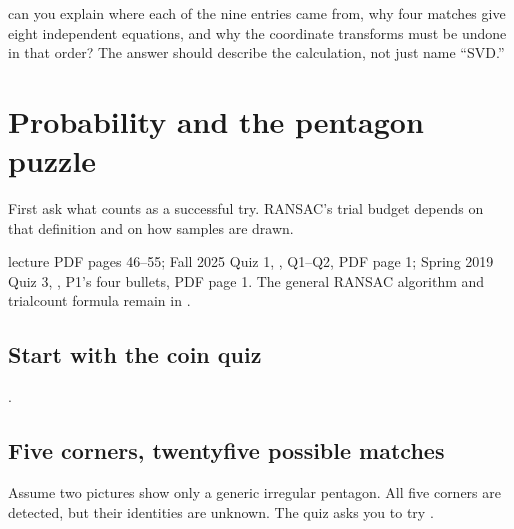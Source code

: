 \documentclass[letterpaper,11pt,english,openany,oneside]{jupyterBook}
\begin{document}
\sphinxAtStartPar
{} can you explain where each of the nine entries came from, why four matches give eight independent equations, and why the coordinate transforms must be undone in that order? The answer should describe the calculation, not just name “SVD.”

\sphinxstepscope


\section{Probability and the pentagon puzzle}
\label{\detokenize{lectures/lecture03/probability-ransac:probability-and-the-pentagon-puzzle}}\label{\detokenize{lectures/lecture03/probability-ransac:lec03-ransac-practice}}\label{\detokenize{lectures/lecture03/probability-ransac::doc}}
\sphinxAtStartPar
{} First ask what counts as a successful try. RANSAC’s trial budget depends on that definition and on how samples are drawn.

\sphinxAtStartPar
{} lecture PDF pages 46–55; Fall 2025 Quiz 1, , Q1–Q2, PDF page 1; Spring 2019 Quiz 3, , P1’s four bullets, PDF page 1. The general RANSAC algorithm and trial\sphinxhyphen{}count formula remain in {\hyperref[\detokenize{lectures/lecture02/estimation::doc}]{}}.


\subsection{Start with the coin quiz}
\label{\detokenize{lectures/lecture03/probability-ransac:start-with-the-coin-quiz}}
\sphinxAtStartPar
{} {\hyperref[\detokenize{lectures/lecture01/quiz-workbook:quiz-17-q1}]{}}.


\subsection{Five corners, twenty\sphinxhyphen{}five possible matches}
\label{\detokenize{lectures/lecture03/probability-ransac:five-corners-twenty-five-possible-matches}}
\sphinxAtStartPar
Assume two pictures show only a generic irregular pentagon. All five corners are detected, but their identities are unknown. The quiz asks you to try .
\end{document}
